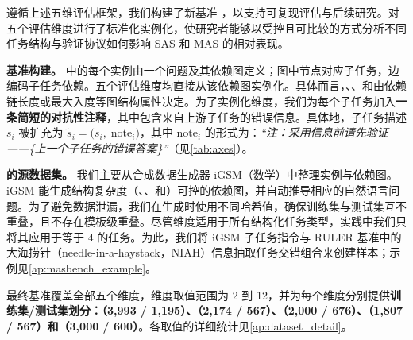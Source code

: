 遵循上述五维评估框架，我们构建了新基准 \textbf{\ourbenchmark}，以支持可复现评估与后续研究。\ourbenchmark 对五个评估维度进行了标准化实例化，使研究者能够以受控且可比较的方式分析不同任务结构与验证协议如何影响 SAS 和 MAS 的相对表现。

\textbf{基准构建。} \ourbenchmark 中的每个实例由一个问题及其依赖图定义；图中节点对应子任务，边编码子任务依赖。五个评估维度均直接从该依赖图实例化。具体而言，\depth、\horizon、\breadth{}和\myparallel{}由依赖链长度或最大入度等图结构属性决定。为了实例化\robustness{}维度，我们为每个子任务加入\textbf{一条简短的对抗性注释}，其中包含来自上游子任务的错误信息。具体地，子任务描述 $s_i$ 被扩充为 $\tilde{s}_i = \big(s_i,\; \text{note}_i\big)$，其中 $\text{note}_i$ 的形式为：\textit{“注：采用信息前请先验证——\{上一个子任务的错误答案\}”}（见\cref{tab:axes}）。




\textbf{\ourbenchmark 的源数据集。}
我们主要从合成数据生成器 iGSM（数学）\cite{YXLA2024-gsm2}中整理实例与依赖图。iGSM 能生成结构复杂度（\depth、\horizon、\breadth{}和\myparallel）可控的依赖图，并自动推导相应的自然语言问题。为了避免数据泄漏，我们在生成时使用不同哈希值，确保训练集与测试集互不重叠，且不存在模板级重叠。尽管\robustness{}维度适用于所有结构化任务类型，实践中我们只将其应用于\depth{}等于 4 的任务。为此，我们将 iGSM 子任务指令与 RULER 基准中的大海捞针（needle-in-a-haystack，NIAH）信息抽取任务\citep{hsieh2024ruler}交错组合来创建样本；示例见\cref{ap:masbench_example}。

最终基准覆盖全部五个维度，维度取值范围为 2 到 12，并为每个维度分别提供\textbf{训练集/测试集划分：\depth（3,993 / 1,195）、\horizon（2,174 / 567）、\breadth（2,000 / 676）、\myparallel（1,807 / 567）和\robustness（3,000 / 600）}。各取值的详细统计见\cref{ap:dataset_detail}。


